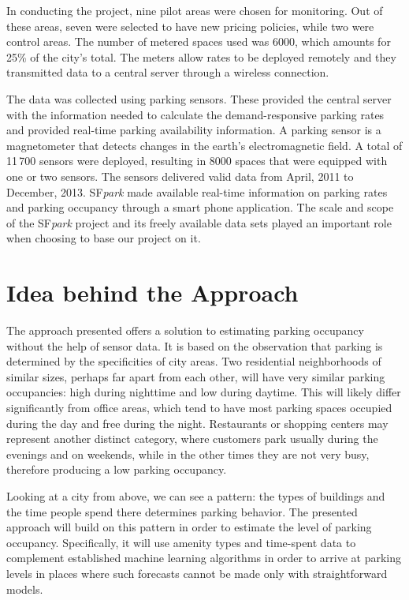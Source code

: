 \documentclass{ws-ijait}
\begin{document}
	In conducting the project, nine pilot areas were chosen for monitoring. Out of these areas, seven were selected to have new pricing policies, while two were control areas. The number of metered spaces used was 6000, which amounts for 25\% of the city's total. The meters allow rates to be deployed remotely and they transmitted data to a central server through a wireless connection.
	
	The data was collected using parking sensors. These provided the central server with the information needed to calculate the demand-responsive parking rates and provided real-time parking availability information. A parking sensor is a magnetometer that detects changes in the earth's electromagnetic field. A total of 11\,700 sensors were deployed, resulting in 8000 spaces that were equipped with one or two sensors. The sensors delivered valid data from April, 2011 to December, 2013. SF\textit{park} made available real-time information on parking rates and parking occupancy through a smart phone application. The scale and scope of the SF\textit{park} project and its freely available data sets played an important role when choosing to base our project on it.
	
	\section{Idea behind the Approach}
	The approach presented offers a solution to estimating parking occupancy without the help of sensor data. It is based on the observation that parking is determined by the specificities of city areas. Two residential neighborhoods of similar sizes, perhaps far apart from each other, will have very similar parking occupancies: high during nighttime and low during daytime. This will likely differ significantly from office areas, which tend to have most parking spaces occupied during the day and free during the night. Restaurants or shopping centers may represent another distinct category, where customers park usually during the evenings and on weekends, while in the other times they are not very busy, therefore producing a low parking occupancy.
	
	Looking at a city from above, we can see a pattern: the types of buildings and the time people spend there determines parking behavior. The presented approach will build on this pattern in order to estimate the level of parking occupancy. Specifically, it will use amenity types and time-spent data to complement established machine learning algorithms in order to arrive at parking levels in places where such forecasts cannot be made only with straightforward models.
	
\end{document}
